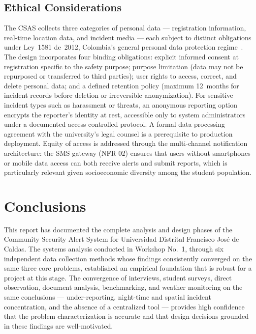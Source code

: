 \documentclass[12pt, oneside]{article}
\begin{document}
\subsection{Ethical Considerations}

The CSAS collects three categories of personal data --- registration information, real-time
location data, and incident media --- each subject to distinct obligations under Ley~1581
de~2012, Colombia's general personal data protection regime~\cite{ley1581}. The design
incorporates four binding obligations: explicit informed consent at registration specific
to the safety purpose; purpose limitation (data may not be repurposed or transferred to
third parties); user rights to access, correct, and delete personal data; and a defined
retention policy (maximum 12~months for incident records before deletion or irreversible
anonymization). For sensitive incident types such as harassment or threats, an anonymous
reporting option encrypts the reporter's identity at rest, accessible only to system
administrators under a documented access-controlled protocol. A formal data processing
agreement with the university's legal counsel is a prerequisite to production deployment.
Equity of access is addressed through the multi-channel notification architecture: the
SMS gateway (NFR-02) ensures that users without smartphones or mobile data access can
both receive alerts and submit reports, which is particularly relevant given socioeconomic
diversity among the student population.

\section{Conclusions}

This report has documented the complete analysis and design phases of the Community
Security Alert System for Universidad Distrital Francisco Jos\'e de Caldas. The systems
analysis conducted in Workshop No.~1, through six independent data collection methods
whose findings consistently converged on the same three core problems, established an
empirical foundation that is robust for a project at this stage. The convergence of
interviews, student surveys, direct observation, document analysis, benchmarking, and
weather monitoring on the same conclusions --- under-reporting, night-time and spatial
incident concentration, and the absence of a centralized tool --- provides high confidence
that the problem characterization is accurate and that design decisions grounded in these
findings are well-motivated.
\end{document}
